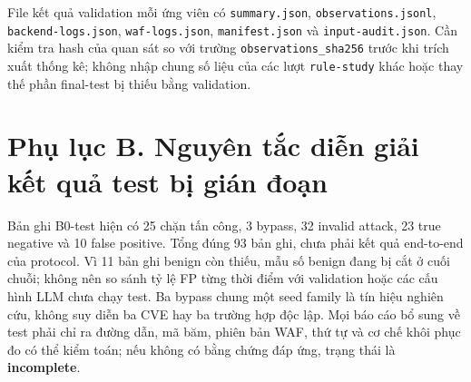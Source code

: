 \documentclass[
  10pt,
  a4paper,
]{article}
\begin{document}
File kết quả validation mỗi ứng viên có \texttt{summary.json},
\texttt{observations.jsonl}, \texttt{backend-logs.json},
\texttt{waf-logs.json}, \texttt{manifest.json} và
\texttt{input-audit.json}. Cần kiểm tra hash của quan sát so với trường
\texttt{observations\_sha256} trước khi trích xuất thống kê; không nhập
chung số liệu của các lượt \texttt{rule-study} khác hoặc thay thế phần
final-test bị thiếu bằng validation.

\section{Phụ lục B. Nguyên tắc diễn giải kết quả test bị gián
đoạn}\label{phux1ee5-lux1ee5c-b.-nguyuxean-tux1eafc-diux1ec5n-giux1ea3i-kux1ebft-quux1ea3-test-bux1ecb-giuxe1n-ux111oux1ea1n}

Bản ghi B0-test hiện có 25 chặn tấn công, 3 bypass, 32 invalid attack,
23 true negative và 10 false positive. Tổng đúng 93 bản ghi, chưa phải
kết quả end-to-end của protocol. Vì 11 bản ghi benign còn thiếu, mẫu số
benign đang bị cắt ở cuối chuỗi; không nên so sánh tỷ lệ FP từng thời
điểm với validation hoặc các cấu hình LLM chưa chạy test. Ba bypass
chung một seed family là tín hiệu nghiên cứu, không suy diễn ba CVE hay
ba trường hợp độc lập. Mọi báo cáo bổ sung về test phải chỉ ra đường
dẫn, mã băm, phiên bản WAF, thứ tự và cơ chế khôi phục đo có thể kiểm
toán; nếu không có bằng chứng đáp ứng, trạng thái là
\textbf{incomplete}.
\end{document}
